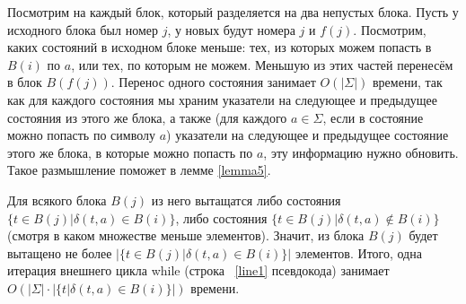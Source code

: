 \documentclass{article}
\begin{document}
Посмотрим на каждый блок, который разделяется на два непустых блока. Пусть у исходного блока был номер $j$, у новых будут номера $j$ и $f(j)$. Посмотрим, каких состояний в исходном блоке меньше: тех, из которых можем попасть в $B(i)$ по $a$, или тех, по которым не можем. Меньшую из этих частей перенесём в блок $B(f(j))$. Перенос одного состояния занимает $O(|\Sigma|)$ времени, так как для каждого состояния мы храним указатели на следующее и предыдущее состояния из этого же блока, а также (для каждого $a \in \Sigma$, если в состояние можно попасть по символу $a$) указатели на следующее и предыдущее состояние этого же блока, в которые можно попасть по $a$, эту информацию нужно обновить. Такое размышление поможет в лемме \ref{lemma5}.



Для всякого блока $B(j)$ из него вытащатся либо состояния $\{t \in B(j) | \delta(t, a) \in B(i)\}$, либо состояния $\{t \in B(j) | \delta(t, a) \notin B(i)\}$ (смотря в каком множестве меньше элементов). Значит, из блока $B(j)$ будет вытащено не более $|\{t \in B(j) | \delta(t, a) \in B(i)\}|$ элементов. Итого, одна итерация внешнего цикла while (строка ~\ref{line1} псевдокода) занимает $O(|\Sigma|\cdot|\{t | \delta(t, a) \in B(i)\}|)$ времени.
\end{document}
